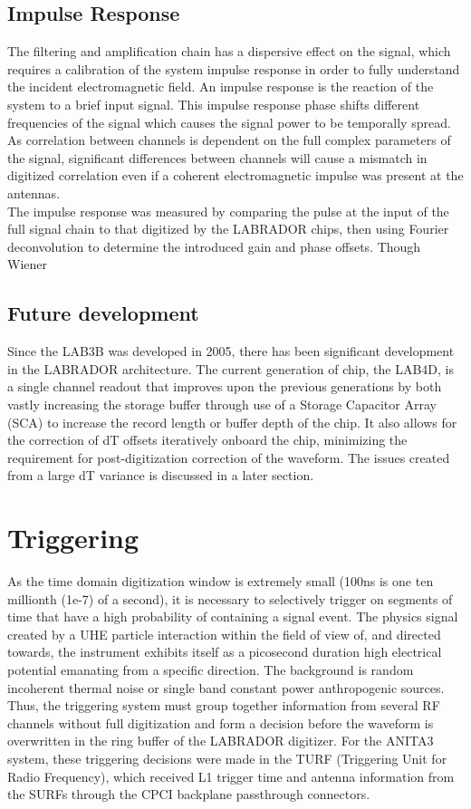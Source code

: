 	\subsection{Impulse Response}
	The filtering and amplification chain has a dispersive effect on the signal, which requires a calibration of the system impulse response in order to fully understand the incident electromagnetic field.  An impulse response is the reaction of the system to a brief input signal. This impulse response phase shifts different frequencies of the signal which causes the signal power to be temporally spread.  As correlation between channels is dependent on the full complex parameters of the signal, significant differences between channels will cause a mismatch in digitized correlation even if a coherent electromagnetic impulse was present at the antennas.  \\
	The impulse response was measured by comparing the pulse at the input of the full signal chain to that digitized by the LABRADOR chips, then using Fourier deconvolution to determine the introduced gain and phase offsets.  Though Wiener 
	
	
	
	\subsection{Future development}
	Since the LAB3B was developed in 2005, there has been significant development in the LABRADOR architecture.  The current generation of chip, the LAB4D, is a single channel readout that improves upon the previous generations by both vastly increasing the storage buffer through use of a Storage Capacitor Array (SCA) to increase the record length or buffer depth of the chip.  It also allows for the correction of dT offsets iteratively onboard the chip, minimizing the requirement for post-digitization correction of the waveform.  The issues created from a large dT variance is discussed in a later section.
	
			
		
\section{Triggering}
	As the time domain digitization window is extremely small (100ns is one ten millionth (1e-7) of a second), it is necessary to selectively trigger on segments of time that have a high probability of containing a signal event.  The physics signal created by a UHE particle interaction within the field of view of, and directed towards, the instrument exhibits itself as a picosecond duration high electrical potential emanating from a specific direction.  The background is random incoherent thermal noise or single band constant power anthropogenic sources.  Thus, the triggering system must group together information from several RF channels without full digitization and form a decision before the waveform is overwritten in the ring buffer of the LABRADOR digitizer.  For the ANITA3 system, these triggering decisions were made in the TURF (Triggering Unit for Radio Frequency), which received L1 trigger time and antenna information from the SURFs through the CPCI backplane passthrough connectors.
